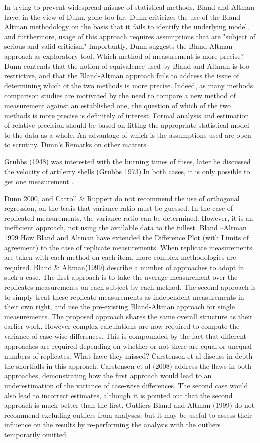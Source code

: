 In trying to prevent widespread misuse of statistical methods, Bland and Altman have, in the view of Dunn, gone too far.
Dunn criticizes the use of the Bland-Altman methodology on the basis that it fails to identify the underlying model, and furthermore, usage of this approach requires assumptions that are "subject of serious and valid criticism"
Importantly, Dunn suggests the Bland-Altman approach as exploratory tool.
Which method of measurement is more precise?
Dunn contends that the notion of equivalence used by Bland and Altman is too restrictive, and that the Bland-Altman approach fails to address the issue of determining which of the two methods is more precise. Indeed, as many methods comparison studies are motivated by the need to compare a new method of measurement against an established one, the question of which of the two methods is more precise is definitely of interest.
Formal analysis and estimation of relative precision should be based on fitting the appropriate statistical model to the data as a whole. An advantage of which is the assumptions used are open to scrutiny.
Dunn’s Remarks on other matters	

Grubbs (1948) was interested with the burning times of fuses,  later he discussed the velocity of artilerry shells (Grubbs 1973).In both cases, it is only possible to get one measurement .

Dunn 2000, and Carroll & Ruppert do not recommend the use of orthogonal regression, on the basis that variance ratio must be guessed.  In the case of replicated measurements, the variance ratio can be determined. However, it is an inefficient approach, not using the available data to the fullest.
Bland –Altman 1999
How Bland and Altman have extended the Difference Plot (with Limits of agreement) to the case of replicate measurements.
When replicate measurements are taken with each method on each item, more complex methodologies are required. Bland & Altman(1999) describe a number of approaches to adopt in such a case. The first approach is to take the average measurement over the replicates measurements on each subject by each method.
The second approach is to simply treat these replicate measurements as independent measurements in their own right, and use the pre-existing Bland-Altman approach for single measurements.
The proposed approach shares the same overall structure as their earlier work. However complex calculations are now required to compute the variance of case-wise differences. This is compounded by the fact that different approaches are required depending on whether or not there are equal or unequal numbers of replicates.
What have they missed? Carstensen et al discuss in depth the shortfalls in this approach.
Carstensen et al (2008) address the flaws in both approaches, demonstrating how the first approach would lead to an underestimation of the variance of case-wise differences. The second case would also lead to incorrect estimates, although it is pointed out that the second approach is much better than the first.
Outliers 
Bland and Altman (1999) do not recommend excluding outliers from analyses, but it may be useful to assess their influence on the results by re-performing the analysis with the outliers temporarily omitted.

